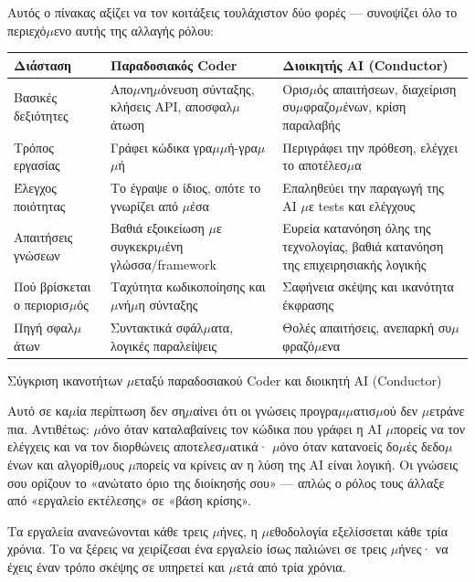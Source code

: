 Αυτός ο πίνακας αξίζει να τον κοιτάξεις τουλάχιστον δύο φορές — συνοψίζει όλο το περιεχό$\mu$ενο αυτής της αλλαγής ρόλου:

\begin{center}
\begin{tabularx}{\linewidth}{|X|X|X|}
\hline
\textbf{Διάσταση} & \textbf{Παραδοσιακός Coder} & \textbf{Διοικητής AI (Conductor)} \tabularnewline
\hline
Βασικές δεξιότητες & Απο$\mu$νη$\mu$όνευση σύνταξης, κλήσεις API, αποσφαλ$\mu$άτωση & Ορισ$\mu$ός απαιτήσεων, διαχείριση συ$\mu$φραζο$\mu$ένων, κρίση παραλαβής \tabularnewline
Τρόπος εργασίας & Γράφει κώδικα γρα$\mu$$\mu$ή-γρα$\mu$$\mu$ή & Περιγράφει την πρόθεση, ελέγχει το αποτέλεσ$\mu$α \tabularnewline
Έλεγχος ποιότητας & Το έγραψε ο ίδιος, οπότε το γνωρίζει από $\mu$έσα & Επαληθεύει την παραγωγή της AI $\mu$ε tests και ελέγχους \tabularnewline
Απαιτήσεις γνώσεων & Βαθιά εξοικείωση $\mu$ε συγκεκρι$\mu$ένη γλώσσα/framework & Ευρεία κατανόηση όλης της τεχνολογίας, βαθιά κατανόηση της επιχειρησιακής λογικής \tabularnewline
Πού βρίσκεται ο περιορισ$\mu$ός & Ταχύτητα κωδικοποίησης και $\mu$νή$\mu$η σύνταξης & Σαφήνεια σκέψης και ικανότητα έκφρασης \tabularnewline
Πηγή σφαλ$\mu$άτων & Συντακτικά σφάλ$\mu$ατα, λογικές παραλείψεις & Θολές απαιτήσεις, ανεπαρκή συ$\mu$φραζό$\mu$ενα \tabularnewline
\hline
\end{tabularx}
\end{center}

\begin{center}\small\color{gray}Σύγκριση ικανοτήτων $\mu$εταξύ παραδοσιακού Coder και διοικητή AI (Conductor)\end{center}

Αυτό σε κα$\mu$ία περίπτωση δεν ση$\mu$αίνει ότι οι γνώσεις προγρα$\mu$$\mu$ατισ$\mu$ού δεν $\mu$ετράνε πια. Αντιθέτως: $\mu$όνο όταν καταλαβαίνεις τον κώδικα που γράφει η AI $\mu$πορείς να τον ελέγχεις και να τον διορθώνεις αποτελεσ$\mu$ατικά· $\mu$όνο όταν κατανοείς δο$\mu$ές δεδο$\mu$ένων και αλγορίθ$\mu$ους $\mu$πορείς να κρίνεις αν η λύση της AI είναι λογική. Οι γνώσεις σου ορίζουν το «ανώτατο όριο της διοίκησής σου» — απλώς ο ρόλος τους άλλαξε από «εργαλείο εκτέλεσης» σε «βάση κρίσης».


Τα εργαλεία ανανεώνονται κάθε τρεις $\mu$ήνες, η $\mu$εθοδολογία εξελίσσεται κάθε τρία χρόνια. Το να ξέρεις να χειρίζεσαι ένα εργαλείο ίσως παλιώνει σε τρεις $\mu$ήνες· να έχεις έναν τρόπο σκέψης σε υπηρετεί και $\mu$ετά από τρία χρόνια.

